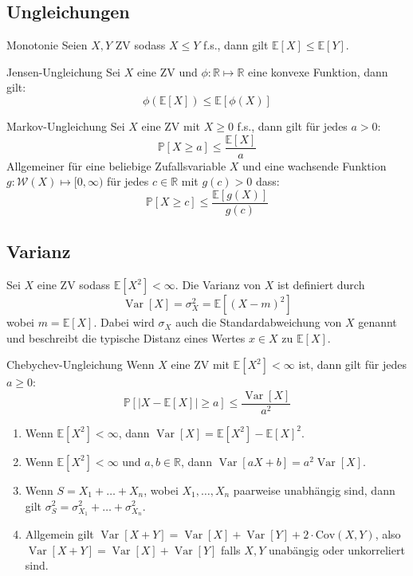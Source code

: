 \documentclass[a4paper,10pt]{article}
\def\R{\mathbb{R}}
\def\P{\mathbb{P}}
\def\E{\mathbb{E}}
\DeclareMathOperator{\Var}{\text{Var}}
\begin{document}
\subsection{Ungleichungen}
\begin{subbox}{Monotonie}
	Seien \(X, Y\) ZV sodass \(X \le Y\) f.s., dann gilt \(\E[X] \le \E[Y]\).
\end{subbox}

\begin{subbox}{Jensen-Ungleichung}
	Sei \(X\) eine ZV und \(\phi : \R \mapsto \R\) eine konvexe Funktion, dann gilt:
	\[\phi(\E[X]) \le \E[\phi(X)]\]
\end{subbox}

\begin{mainbox}{Markov-Ungleichung}
	Sei \(X\) eine ZV mit \(X \ge 0\) f.s., dann gilt für jedes \(a > 0\):
	\[\P[X\ge a] \le \frac{\E[X]}{a}\]
	Allgemeiner für eine beliebige Zufallsvariable $X$ und eine wachsende Funktion $g: \mathcal{W}(X) \mapsto [0, \infty)$ für jedes $c \in \R$ mit $g(c) > 0$ dass:
	$$\P[X \geq c] \leq \frac{\E[g(X)]}{g(c)}$$
\end{mainbox}

\subsection{Varianz}
Sei \(X\) eine ZV sodass \(\E[X^2] < \infty\). Die Varianz von \(X\) ist definiert durch
\[\Var[X] = \sigma_X^2 = \E[(X-m)^2]\]
wobei \(m=\E[X]\). Dabei wird \(\sigma_X\) auch die Standardabweichung von \(X\) genannt und beschreibt die typische Distanz eines Wertes \(x\in X\) zu \(\E[X]\).

\begin{subbox}{Chebychev-Ungleichung}
	Wenn \(X\) eine ZV mit \(\E[X^2] < \infty\) ist, dann gilt für jedes \(a \ge 0\):
	\[\P[|X - \E[X]| \ge a] \le \frac{\Var[X]}{a^2}\]
\end{subbox}

\begin{enumerate}
	\item Wenn \(\E[X^2] < \infty\), dann \(\Var[X] = \E[X^2] - \E[X]^2\).
	\item Wenn \(\E[X^2] < \infty\) und \(a, b \in \R\), dann \(\Var[a X + b] = a^2 \Var[X]\).
	\item Wenn \(S = X_1 + \ldots + X_n\), wobei \(X_1, \ldots, X_n\) paarweise unabhängig sind, dann gilt \(\sigma_S^2 = \sigma_{X_1}^2 + \ldots + \sigma_{X_n}^2\).
	\item Allgemein gilt $\Var[X + Y] = \Var[X] + \Var[Y] + 2 \cdot \text{Cov}(X, Y)$, also $\Var[X + Y] = \Var[X] + \Var[Y]$ falls $X, Y$ unabängig oder unkorreliert sind.
\end{enumerate}
\end{document}
